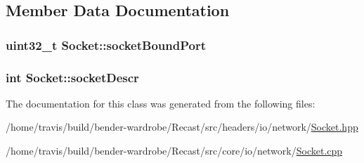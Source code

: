 \subsection{Member Data Documentation}
\hypertarget{class_socket_ab05ebf38966e1cd1f093819a6bdad5b1}{
\subsubsection[{socket\-Bound\-Port}]{\setlength{\rightskip}{0pt plus 5cm}uint32\-\_\-t Socket\-::socket\-Bound\-Port\hspace{0.3cm}{\ttfamily [protected]}}}\label{class_socket_ab05ebf38966e1cd1f093819a6bdad5b1}
\hypertarget{class_socket_a610fbf456550dd084cfaee9d1267e5c8}{
\subsubsection[{socket\-Descr}]{\setlength{\rightskip}{0pt plus 5cm}int Socket\-::socket\-Descr\hspace{0.3cm}{\ttfamily [protected]}}}\label{class_socket_a610fbf456550dd084cfaee9d1267e5c8}


The documentation for this class was generated from the following files\-:\begin{DoxyCompactItemize}
\item 
/home/travis/build/bender-\/wardrobe/\-Recast/src/headers/io/network/\hyperlink{_socket_8hpp}{Socket.\-hpp}\item 
/home/travis/build/bender-\/wardrobe/\-Recast/src/core/io/network/\hyperlink{_socket_8cpp}{Socket.\-cpp}\end{DoxyCompactItemize}

